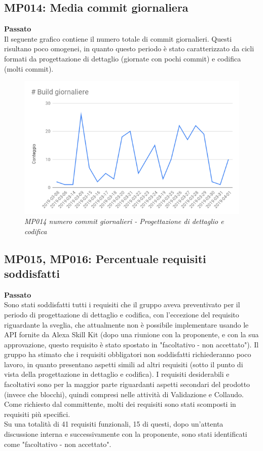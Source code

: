 \subsection{MP014: Media commit giornaliera}
\textbf{Passato}\\
Il seguente grafico contiene il numero totale di commit giornalieri. Questi risultano poco omogenei, in quanto questo periodo è stato caratterizzato da cicli formati da progettazione di dettaglio (giornate con pochi commit) e codifica (molti commit).\\
\begin{figure} [H]
    \centering
	\includegraphics[scale=0.4]{./images/buildsPDC.png}
    \caption{\textit{MP014 numero commit giornalieri - Progettazione di dettaglio e codifica}}
\end{figure}

\subsection{MP015, MP016: Percentuale requisiti soddisfatti}
\textbf{Passato}\\
Sono stati soddisfatti tutti i requisiti che il gruppo aveva preventivato per il periodo di progettazione di dettaglio e codifica, con l'eccezione del requisito riguardante la sveglia, che attualmente non è possibile implementare usando le API fornite da Alexa Skill Kit (dopo una riunione con la proponente, e con la sua approvazione,  questo requisito è stato spostato in "facoltativo - non accettato").
Il gruppo ha stimato che i requisiti obbligatori non soddisfatti richiederanno poco lavoro, in quanto presentano aspetti simili ad altri requisiti (sotto il punto di vista della progettazione in dettaglio e codifica). I requisiti desiderabili e facoltativi sono per la maggior parte riguardanti aspetti secondari del prodotto (invece che blocchi), quindi compresi nelle attività di Validazione e Collaudo.\\
Come richiesto dal committente, molti dei requisiti sono stati scomposti in requisiti più specifici.\\
Su una totalità di 41 requisiti funzionali, 15 di questi, dopo un'attenta discussione interna e successivamente con la proponente, sono stati identificati come "facoltativo - non accettato".


